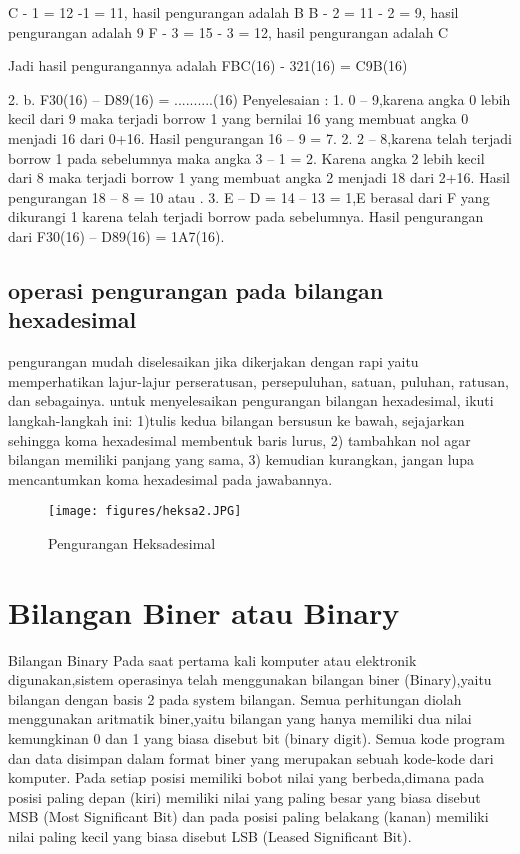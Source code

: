 C - 1 = 12 -1 = 11, hasil pengurangan adalah B 
B - 2 = 11 - 2 = 9,  hasil pengurangan adalah 9
F - 3 = 15 - 3 = 12, hasil pengurangan adalah C 

Jadi hasil pengurangannya adalah  FBC(16) - 321(16) = C9B(16) 

	2. b.	F30(16) – D89(16) =  ..........(16)
Penyelesaian :
1.	0 – 9,karena angka 0 lebih kecil dari 9 maka terjadi borrow 1 yang bernilai 16 yang membuat angka 0 menjadi 16 dari 0+16. Hasil pengurangan 16 – 9 = 7.
2.	2 – 8,karena telah terjadi borrow 1 pada sebelumnya maka angka 3 – 1 = 2. Karena angka 2 lebih kecil dari 8 maka terjadi borrow 1 yang membuat angka 2 menjadi 18 dari 2+16. Hasil pengurangan 18 – 8 = 10 atau .
3.	E – D = 14 – 13 = 1,E berasal dari F yang dikurangi 1 karena telah terjadi borrow pada sebelumnya.
Hasil pengurangan dari F30(16) – D89(16) = 1A7(16).
	
\subsection{operasi pengurangan pada bilangan hexadesimal}
pengurangan mudah diselesaikan jika dikerjakan dengan rapi yaitu memperhatikan lajur-lajur perseratusan, persepuluhan, satuan, puluhan, ratusan, dan sebagainya. untuk menyelesaikan pengurangan bilangan hexadesimal, ikuti langkah-langkah ini: 1)tulis kedua bilangan bersusun ke bawah, sejajarkan sehingga koma hexadesimal membentuk baris lurus, 2) tambahkan nol agar bilangan memiliki panjang yang sama, 3) kemudian kurangkan, jangan lupa mencantumkan koma hexadesimal pada jawabannya.

\begin{figure}[ht]
\centerline{\texttt{[image: figures/heksa2.JPG]}}
\caption{Pengurangan Heksadesimal}
\label{Bilangandesimal}
\end {figure}

\section {Bilangan Biner atau Binary}
Bilangan Binary Pada saat pertama kali komputer atau elektronik digunakan,sistem operasinya telah menggunakan bilangan biner (Binary),yaitu bilangan dengan basis 2 pada system bilangan. Semua perhitungan diolah menggunakan aritmatik biner,yaitu bilangan yang hanya memiliki dua nilai kemungkinan 0 dan 1 yang biasa disebut bit (binary digit). Semua kode program dan data disimpan dalam format biner yang merupakan sebuah kode-kode dari komputer. Pada setiap posisi memiliki bobot nilai yang berbeda,dimana pada posisi paling depan (kiri) memiliki nilai yang paling besar yang biasa disebut MSB (Most Significant Bit) dan pada posisi paling belakang (kanan) memiliki nilai paling kecil yang biasa disebut LSB (Leased Significant Bit).
	
